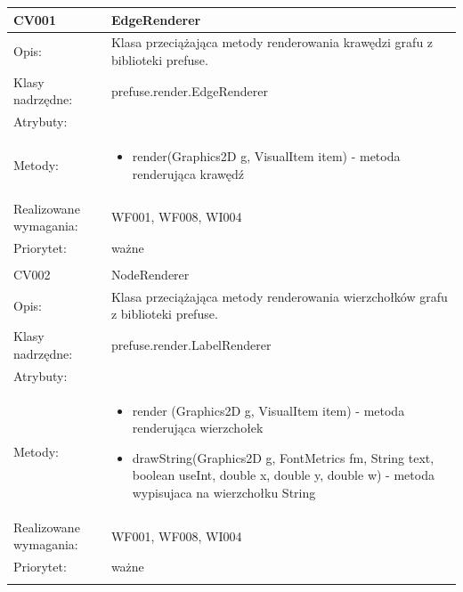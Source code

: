 \begin{center}
 

\begin{longtable}{|m{3cm}|m{9cm}|} \hline

CV001 & EdgeRenderer \\ \hline
Opis: & Klasa przeciążająca metody renderowania krawędzi grafu z biblioteki prefuse. \\ \hline
Klasy nadrzędne: &  prefuse.render.EdgeRenderer   \\ \hline
Atrybuty: & %
 \\ \hline
Metody: & \begin{itemize}
 \item render(Graphics2D g, VisualItem item) - metoda renderująca krawędź
\end{itemize}
  \\ \hline
Realizowane wymagania: & WF001, WF008, WI004 \\ \hline
Priorytet: & ważne  \\ \hline

\multicolumn{2}{c}{} \\
 \hline

CV002 & NodeRenderer \\ \hline
Opis: & Klasa przeciążająca metody renderowania wierzchołków grafu z biblioteki prefuse.    \\ \hline
Klasy nadrzędne: &  prefuse.render.LabelRenderer   \\ \hline
Atrybuty: & %
 \\ \hline
Metody: & \begin{itemize}
 \item render (Graphics2D g, VisualItem item) - metoda renderująca wierzchołek
\item drawString(Graphics2D g, FontMetrics fm, String text,
            boolean useInt, double x, double y, double w) - metoda wypisujaca na wierzchołku String
\end{itemize}
  \\ \hline
Realizowane wymagania: & WF001, WF008, WI004 \\ \hline
Priorytet: & ważne  \\ \hline

\multicolumn{2}{c}{} \\
 \hline


\end{longtable}
\end{center}
